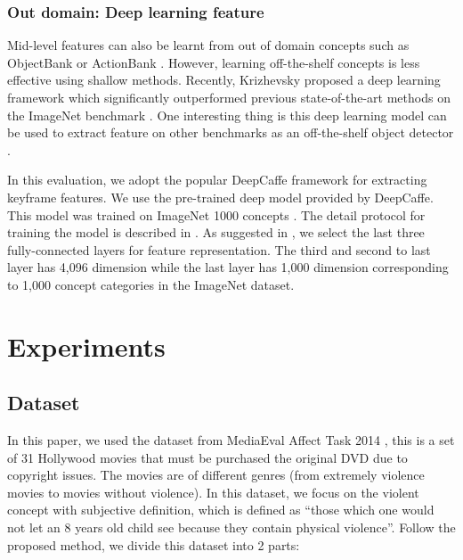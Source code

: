 \documentclass[twocolumn]{bmcart}%
\begin{document}
\subsubsection{Out domain: Deep learning feature}
Mid-level features can also be learnt from out of domain concepts such as ObjectBank \cite{15} or ActionBank \cite{23}. However, learning off-the-shelf concepts is less effective using shallow methods. Recently, Krizhevsky \cite{krizhevsky2012imagenet} proposed a deep learning framework which significantly outperformed previous state-of-the-art methods on the ImageNet benchmark \cite{deng2009imagenet}. One interesting thing is this deep learning model can be used to extract feature on other benchmarks as an off-the-shelf object detector \cite{donahue2013decaf}. 

In this evaluation, we adopt the popular DeepCaffe \cite{jia2014caffe} framework for extracting keyframe features. We use the pre-trained deep model provided by DeepCaffe. This model was trained on ImageNet 1000 concepts \cite{deng2009imagenet}. The detail protocol for training the model is described in \cite{jia2014caffe}. As suggested in \cite{krizhevsky2012imagenet}, we select the last three fully-connected layers for feature representation. The third and second to last layer has 4,096 dimension while the last layer has 1,000 dimension corresponding to 1,000 concept categories in the ImageNet dataset.

\section{Experiments}
\subsection{Dataset}
In this paper, we used the dataset from MediaEval  Affect Task 2014 \cite{demarty2014benchmarking}, this is a set of 31 Hollywood movies that must be purchased the original DVD due to copyright issues. The movies are of different genres (from extremely violence movies to movies without violence). In this dataset, we focus on the violent concept with subjective definition, which is defined as “those which one would not let an 8 years old child see because they contain physical violence”. Follow the proposed method, we divide this dataset into 2 parts:
\end{document}
